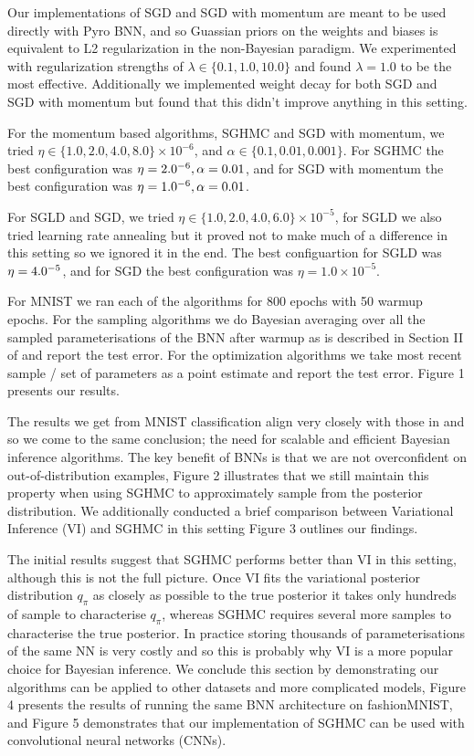 Our implementations of SGD and SGD with momentum are meant to be used directly with Pyro BNN, and so Guassian priors on the weights and biases is equivalent to L2 regularization in the non-Bayesian paradigm. We experimented with regularization strengths of $\lambda \in \{0.1, 1.0, 10.0\}$ and found $\lambda = 1.0$ to be the most effective. Additionally we implemented weight decay for both SGD and SGD with momentum but found that this didn't improve anything in this setting.

For the momentum based algorithms, SGHMC and SGD with momentum, we tried $\eta \in \{1.0, 2.0, 4.0, 8.0 \} \times 10^{-6}$, and $\alpha \in \{0.1, 0.01, 0.001 \}$. For SGHMC the best configuration was $\eta = 2.0\time10^{-6}, \alpha=0.01$, and for SGD with momentum the best configuration was $\eta = 1.0\time10^{-6}, \alpha=0.01$.

For SGLD and SGD, we tried $\eta \in \{1.0, 2.0, 4.0, 6.0\} \times 10^{-5}$, for SGLD we also tried learning rate annealing but it proved not to make much of a difference in this setting so we ignored it in the end. The best configuartion for SGLD was $\eta = 4.0\time10^{-5}$, and for SGD the best configuration was $\eta = 1.0\times10^{-5}$.

For MNIST we ran each of the algorithms for 800 epochs with 50 warmup epochs. For the sampling algorithms we do Bayesian averaging over all the sampled parameterisations of the BNN after warmup as is described in Section II of \cite{hands-on-bnn} and report the test error. For the optimization algorithms we take most recent sample / set of parameters as a point estimate and report the test error.  Figure 1 presents our results.



The results we get from MNIST classification align very closely with those in \cite{sghmc} and so we come to the same conclusion; the need for scalable and efficient Bayesian inference algorithms. The key benefit of BNNs is that we are not overconfident on out-of-distribution examples, Figure 2 illustrates that we still maintain this property when using SGHMC to approximately sample from the posterior distribution. We additionally conducted a brief comparison between Variational Inference (VI) and SGHMC in this setting Figure 3 outlines our findings.

The initial results suggest that SGHMC performs better than VI in this setting, although this is not the full picture. Once VI fits the variational posterior distribution $q_{\pi}$ as closely as possible to the true posterior it takes only hundreds of sample to characterise $q_{\pi}$, whereas SGHMC requires several more samples to characterise the true posterior. In practice storing thousands of parameterisations of the same NN is very costly and so this is probably why VI is a more popular choice for Bayesian inference. We conclude this section by demonstrating our algorithms can be applied to other datasets and more complicated models, Figure 4 presents the results of running the same BNN architecture on fashionMNIST, and Figure 5 demonstrates that our implementation of SGHMC can be used with convolutional neural networks (CNNs).
